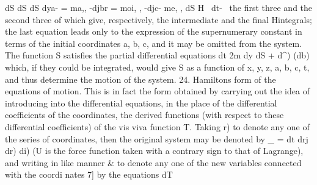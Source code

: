 \documentclass[11pt,a4paper]{book}
\begin{document}
dS dS dS
dya-
= ma,,
-djbr
= moi,
, -djc-
me,
,
dS
H
~dt-~
the first three and the second three of which give, respectively, the intermediate and
the final Hintegrals; the last equation leads only to the expression of the supernumerary
constant in terms of the initial coordinates a, b, c, and it may be omitted from the
system.
The function S satisfies the partial differential equations
dt 2m \dx dy \dz
dS
+
d^) (db)
which, if they could be integrated, would give S as a function of x, y, z, a, b, c, t,
and thus determine the motion of the system.
24. Hamiltons form of the equations of motion. This is in fact the form obtained
by carrying out the idea of introducing into the differential equations, in the place
of the differential coefficients of the coordinates, the derived functions (with respect to
these differential coefficients) of the vis viva function T. Taking r) to denote any one
of the series of coordinates, then the original system may be denoted by
_ =
dt drj dr) di)
(U is the force function taken with a contrary sign to that of Lagrange), and writing
in like manner & to denote any one of the new variables connected with the coordi
nates 7] by the equations
dT


\end{document}
